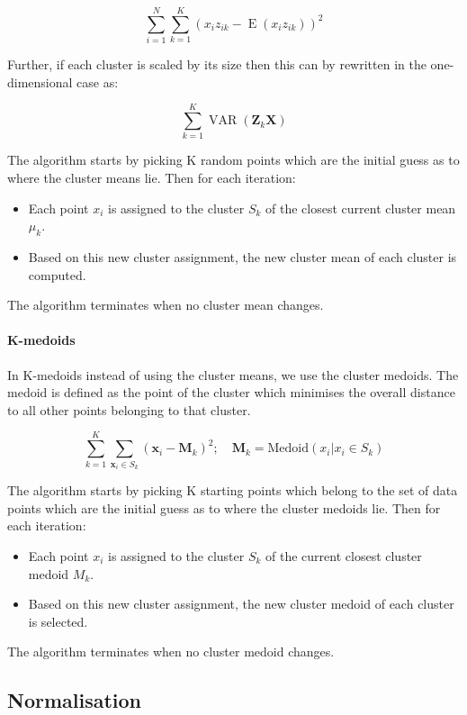 \[
  \sum_{i=1}^N \sum_{k=1}^{K} ( x_i z_{ik} - \operatorname{E}(x_i z_{ik}) )^2 
\]

Further, if each cluster is scaled by its size then this can by rewritten in the one-dimensional case as:


\[
  \sum_{k=1}^{K} \operatorname{VAR}(\mathbf Z_k \mathbf X)
\]



The algorithm starts by picking K random points which are the initial guess as to where the cluster means lie.
Then for each iteration:
\begin{itemize}
    \item Each point $x_i$ is assigned to the cluster $S_k$ of the closest current cluster mean $\mu_k$.
    \item Based on this new cluster assignment, the new cluster mean of each cluster is computed.
\end{itemize}
The algorithm terminates when no cluster mean changes.

\vspace{1em}
\noindent


\paragraph{K-medoids}

In K-medoids instead of using the cluster means, we use the cluster medoids.
The medoid is defined as the point of the cluster which minimises the overall distance to all other points belonging to that cluster.

\[
    \sum_{k=1}^{K} \sum_{\mathbf x_i \in S_k} ( \mathbf x_i - \boldsymbol M_k )^2 ; \quad \boldsymbol M_k=\text{Medoid}(x_i| x_i \in S_k)
\]

The algorithm starts by picking K starting points which belong to the set of data points which are the initial guess as to where the cluster medoids lie.
Then for each iteration:
\begin{itemize}
    \item Each point $x_i$ is assigned to the cluster $S_k$ of the current closest cluster medoid $M_k$.
    \item Based on this new cluster assignment, the new cluster medoid of each cluster is selected.
\end{itemize}
The algorithm terminates when no cluster medoid changes.

\subsection{Normalisation}

